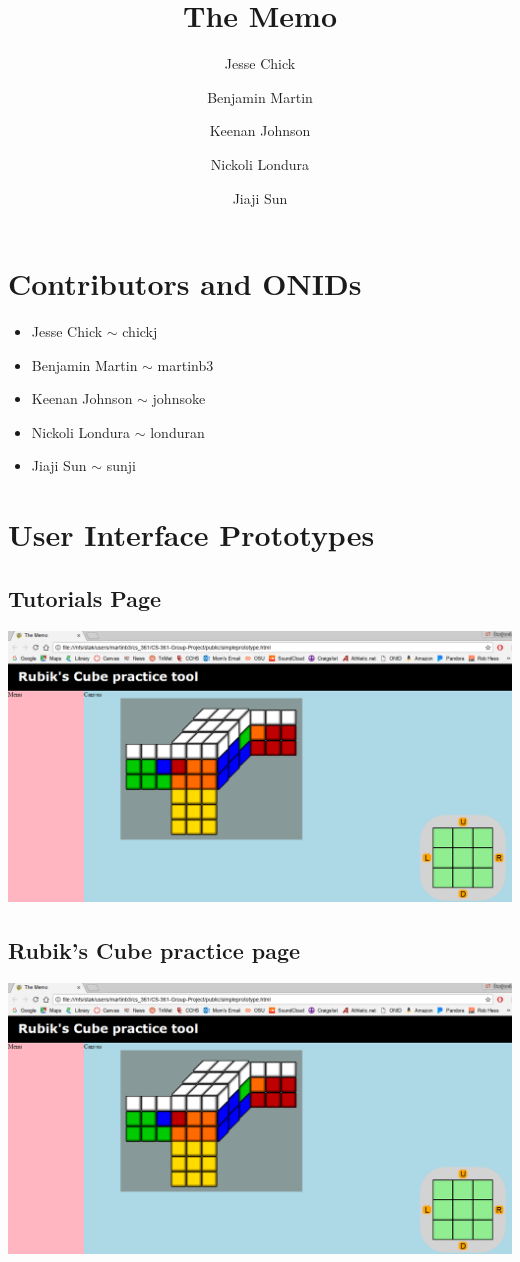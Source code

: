 \documentclass[12pt]{article}
\title{The Memo}
\author{Jesse Chick\\
\and Benjamin Martin\\
\and Keenan Johnson\\
\and Nickoli Londura\\
\and Jiaji Sun}
\begin{document}
\maketitle
\tableofcontents

\section{Contributors and ONIDs}
\begin{itemize}
	\item Jesse Chick $\sim$ chickj
	\item Benjamin Martin $\sim$ martinb3
	\item Keenan Johnson $\sim$ johnsoke
	\item Nickoli Londura $\sim$ londuran
	\item Jiaji Sun $\sim$ sunji
\end{itemize}

\section{User Interface Prototypes}

	\subsection{Tutorials Page}
	\includegraphics[width = \textwidth]{image.png}
	\subsection{Rubik's Cube practice page}
	\includegraphics[width = \textwidth]{cubepage.PNG}
\end{document}
